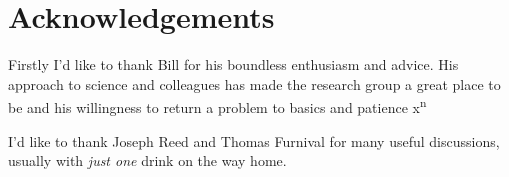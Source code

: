 \clearpage

\doublespacing

\section*{Acknowledgements}
Firstly I'd like to thank Bill for his boundless enthusiasm and advice. His approach to science and colleagues has made the research group a great place to be and his willingness to return a problem to basics and patience x\textsuperscript{n}


I'd like to thank Joseph Reed and Thomas Furnival for many useful discussions, usually with \emph{just one} drink on the way home.



























































